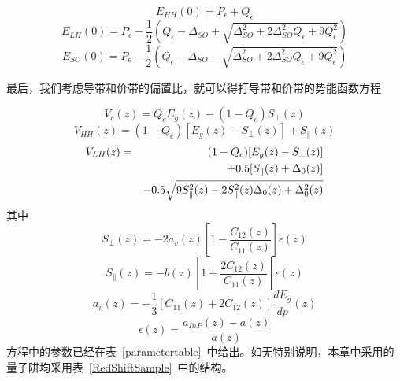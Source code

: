 \documentclass{ZJUthesis}
\begin{document}
\begin{equation}
    E_{HH}(0) = P_{\epsilon} + Q_{\epsilon}
\end{equation}
\begin{equation}
    E_{LH}(0) = P_{\epsilon} - \frac{1}{2} \left( Q_{\epsilon} - \Delta_{SO} + \sqrt{\Delta^2_{SO} + 2 \Delta^2_{SO} Q_{\epsilon} + 9 Q^2_{\epsilon}} \right)
\end{equation}
\begin{equation}
    E_{SO}(0) = P_{\epsilon} - \frac{1}{2} \left( Q_{\epsilon} - \Delta_{SO} - \sqrt{\Delta^2_{SO} + 2 \Delta^2_{SO} Q_{\epsilon} + 9 Q^2_{\epsilon}} \right)
\end{equation}

最后，我们考虑导带和价带的偏置比，就可以得打导带和价带的势能函数方程

\begin{equation}
    \label{V_c}
    V_c(z) = Q_c E_g(z) - (1-Q_c)S_\perp(z)
\end{equation}
\begin{equation}
    \label{V_HH}
    V_{HH}(z) = (1-Q_c)[E_g(z) - S_\perp(z)] + S_\parallel(z)
\end{equation}
\begin{eqnarray}
    \label{V_LH}
    V_{LH}(z)&=& (1-Q_c)[E_g(z) - S_\perp(z)] \notag\\
    && +0.5[S_\parallel(z) + \Delta_0(z)] \notag\\
    && -0.5 \sqrt{9S_\parallel^2(z)-2S_\parallel^2(z)\Delta_0(z)+\Delta_0^2(z)}
\end{eqnarray}
其中
\begin{equation}
    \label{S_perp}
    S_\perp(z) = -2a_v(z)[1-\frac{C_{12}(z)}{C_{11}(z)}] \epsilon(z)
\end{equation}
\begin{equation}\label{S_parallel}
    S_\parallel(z) = -b(z)[1+\frac{2C_{12}(z)}{C_{11}(z)}] \epsilon(z)
\end{equation}
\begin{equation}\label{a_v}
    a_v(z) = -\frac{1}{3}[C_{11}(z)+2C_{12}(z)] \frac{dE_g}{dp}(z)
\end{equation}
\begin{equation}\label{epsilon}
    \epsilon(z) = \frac{a_{InP}(z)-a(z)}{a(z)}
\end{equation}
方程中的参数已经在表~\ref{parametertable}~中给出。如无特别说明，本章中采用的量子阱均采用表~\ref{RedShiftSample}~中的结构。
\end{document}
